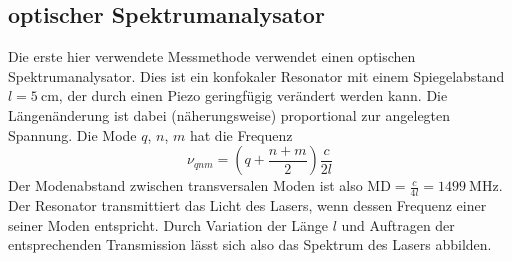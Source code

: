 \documentclass{article}
\newcommand{\mr}{\mathrm}
\begin{document}
\subsection{optischer Spektrumanalysator}
Die erste hier verwendete Messmethode verwendet einen optischen Spektrumanalysator.
Dies ist ein konfokaler Resonator mit einem Spiegelabstand $l=\SI{5}{\cm}$, der durch einen Piezo geringfügig verändert werden kann.
Die Längenänderung ist dabei (näherungsweise) proportional zur angelegten Spannung.
Die Mode $q$, $n$, $m$ hat die Frequenz
\begin{equation}
  \nu_{qnm} = \left(q + \frac{n + m}{2}\right)\frac{c}{2l}
\end{equation}
Der Modenabstand zwischen transversalen Moden ist also $\mr{MD} = \frac{c}{4l} = \SI{1499}{\MHz}$.
Der Resonator transmittiert das Licht des Lasers, wenn dessen Frequenz einer seiner Moden entspricht.
Durch Variation der Länge $l$ und Auftragen der entsprechenden Transmission lässt sich also das Spektrum des Lasers abbilden.
\end{document}
